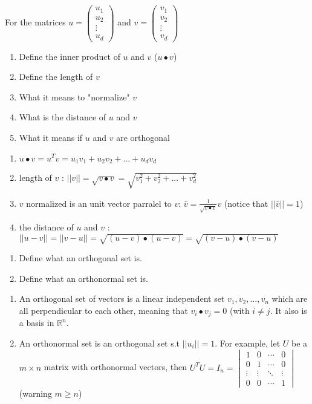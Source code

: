 \documentclass[12pt]{article}
\newcommand*{\xfield}[1]{\begin{mdframed}\centering #1\end{mdframed}\bigskip}
\newenvironment{note}{}{}
\begin{document}
\begin{note}
	\xfield{
	For the matrices $u=\begin{pmatrix}
	u_1\\
	u_2\\
	\vdots\\
	u_d
	\end{pmatrix}$ and $v=\begin{pmatrix}
	v_1\\
	v_2\\
	\vdots\\
	v_d
	\end{pmatrix}$
	\begin{enumerate}
	\item Define the inner product of $u$ and $v$ ($u 	\bullet v$)
	\item Define the length of $v$
	\item What it means to "normalize" $v$
	\item What is the distance of $u$ and $v$
	\item What it means if $u$ and $v$ are orthogonal
	\end{enumerate} }
	\xfield{\begin{enumerate}
	\item $u \bullet v = u^T v=u_1 v_1+u_2 v_2+...+u_d v_d $
	\item length of $v$ : $||v|| = \sqrt{v\bullet v} = \sqrt{v_1^2+v_2^2+...+v_d^2}$
	\item $v$ normalized is an unit vector parralel to $v$: $\bar{v} = \frac{1}{\sqrt{v\bullet v}}v$ (notice that $||\bar{v}|| = 1$)
		\item the distance of $u$ and $v$ : $||u-v|| = ||v-u|| = \sqrt{(u-v) \bullet (u-v)} = \sqrt{(v-u)\bullet (v-u)}$
	\end{enumerate} }
\end{note}

\begin{note}
	\xfield{\begin{enumerate}
	\item Define what an orthogonal set is.
	\item Define what an orthonormal set is.
	\end{enumerate} }
	\xfield{\begin{enumerate}
	\item  An orthogonal set of vectors is a linear independent set $v_1,v_2,...,v_n$ which are all perpendicular to each other, meaning that $v_i \bullet v_j = 0$ (with $i\neq j$. It also is a basis in $\mathbb{R}^n$.
	\item An orthonormal set is an orthogonal set s.t $\vert\vert u_i \vert\vert = 1$. For example, let $U$ be a $m\times n$ matrix with orthonormal vectors, then $U^TU = I_n = \begin{vmatrix}
	1 & 0 & \cdots & 0\\
	0 & 1 & \cdots & 0\\
	\vdots & \vdots &\ddots & \vdots\\
	0 & 0 & \cdots & 1
	\end{vmatrix}$ (warning $m \ge n$)
	\end{enumerate} }
\end{note}
\end{document}
